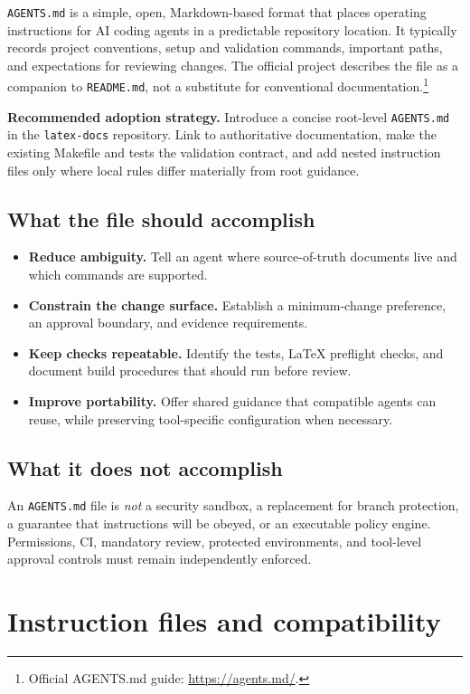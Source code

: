 \documentclass[11pt,letterpaper]{article}
\begin{document}
\texttt{AGENTS.md} is a simple, open, Markdown-based format that places operating instructions for AI coding agents in a predictable repository location. It typically records project conventions, setup and validation commands, important paths, and expectations for reviewing changes. The official project describes the file as a companion to \texttt{README.md}, not a substitute for conventional documentation.\footnote{Official AGENTS.md guide: \url{https://agents.md/}.}

\begin{infobox}
\textbf{Recommended adoption strategy.} Introduce a concise root-level \texttt{AGENTS.md} in the \texttt{latex-docs} repository. Link to authoritative documentation, make the existing Makefile and tests the validation contract, and add nested instruction files only where local rules differ materially from root guidance.
\end{infobox}

\subsection{What the file should accomplish}
\begin{itemize}
\item \textbf{Reduce ambiguity.} Tell an agent where source-of-truth documents live and which commands are supported.
\item \textbf{Constrain the change surface.} Establish a minimum-change preference, an approval boundary, and evidence requirements.
\item \textbf{Keep checks repeatable.} Identify the tests, LaTeX preflight checks, and document build procedures that should run before review.
\item \textbf{Improve portability.} Offer shared guidance that compatible agents can reuse, while preserving tool-specific configuration when necessary.
\end{itemize}

\subsection{What it does not accomplish}
An \texttt{AGENTS.md} file is \emph{not} a security sandbox, a replacement for branch protection, a guarantee that instructions will be obeyed, or an executable policy engine. Permissions, CI, mandatory review, protected environments, and tool-level approval controls must remain independently enforced.

\section{Instruction files and compatibility}
\end{document}
